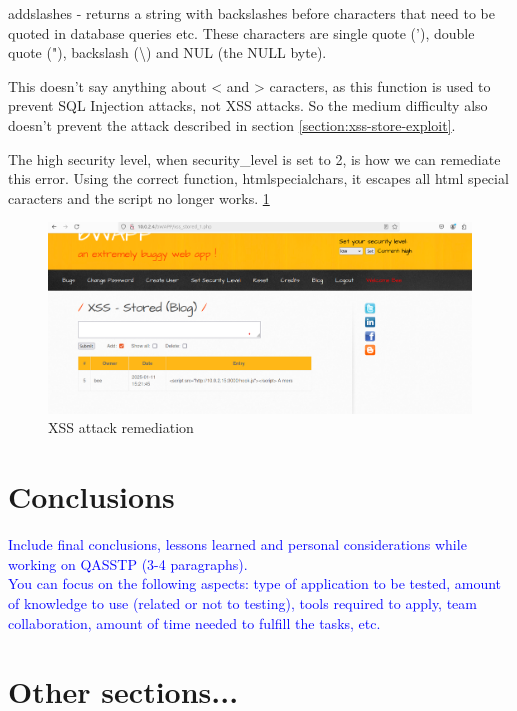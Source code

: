 \documentclass{article}
\begin{document}
addslashes - returns a string with backslashes before characters that need to be quoted in database queries etc.
These characters are single quote ('), double quote ("), backslash (\textbackslash) and NUL (the NULL byte).


This doesn't say anything about < and > caracters, as this function is used to prevent SQL Injection attacks, not XSS attacks.
So the medium difficulty also doesn't prevent the attack described in section \ref{section:xss-store-exploit}.

The high security level, when security\_level is set to 2, is how we can remediate this error.
Using the correct function, htmlspecialchars, it escapes all html special caracters and the script no longer works. \ref{fig:no-longer-works}

\begin{figure}
    \centering
    \includegraphics[width=1\linewidth]{Figures/beef/no-longer-works.png}
    \caption{\label{fig:no-longer-works}XSS attack remediation}
\end{figure}

\section{Conclusions}
\label{}

\textcolor{blue}{Include final conclusions, lessons learned and personal considerations while working on QASSTP (3-4 paragraphs).\\
    You can focus on the following aspects: type of application to be tested, amount of knowledge to use (related or not to testing), tools required to apply, team collaboration, amount of time needed to fulfill the tasks, etc.}

\section{Other sections...}
\end{document}
